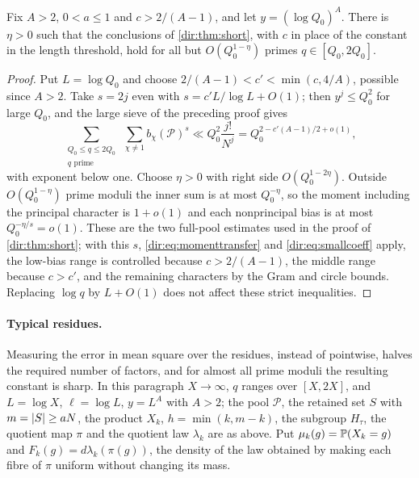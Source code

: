 \begin{corollary}\label{dir:cor:almostshort}
Fix $A>2$, $0<a\le1$ and $c>2/(A-1)$, and let $y=(\log Q_0)^A$. There is $\eta>0$ such that
the conclusions of \cref{dir:thm:short}, with $c$ in place of the constant in the length
threshold, hold for all but $O(Q_0^{1-\eta})$ primes $q\in[Q_0,2Q_0]$.
\end{corollary}

\begin{proof}
Put $L=\log Q_0$ and choose $2/(A-1)<c'<\min(c,4/A)$, possible since $A>2$. Take $s=2j$ even
with $s=c'L/\log L+O(1)$; then $y^j\le Q_0^2$ for large $Q_0$, and the large sieve of the
preceding proof gives
\[
 \sum_{\substack{Q_0\le q\le2Q_0\\ q\text{ prime}}}\ \sum_{\chi\ne1}b_\chi(\mathcal P)^s
 \ll Q_0^2\frac{j!}{N^j}=Q_0^{2-c'(A-1)/2+o(1)},
\]
with exponent below one. Choose $\eta>0$ with right side $O(Q_0^{1-2\eta})$. Outside
$O(Q_0^{1-\eta})$ prime moduli the inner sum is at most $Q_0^{-\eta}$, so the moment including
the principal character is $1+o(1)$ and each nonprincipal bias is at most
$Q_0^{-\eta/s}=o(1)$. These are the two full-pool estimates used in the proof of
\cref{dir:thm:short}; with this $s$, \eqref{dir:eq:momenttransfer} and \eqref{dir:eq:smallcoeff}
apply, the low-bias range is controlled because $c>2/(A-1)$, the middle range because $c>c'$,
and the remaining characters by the Gram and circle bounds. Replacing $\log q$ by $L+O(1)$
does not affect these strict inequalities.
\end{proof}

\paragraph{Typical residues.}
Measuring the error in mean square over the residues, instead of pointwise, halves the required
number of factors, and for almost all prime moduli the resulting constant is sharp. In this paragraph
$X\to\infty$, $q$ ranges over $[X,2X]$, and $L=\log X$, $\ell=\log L$, $y=L^A$ with $A>2$; the pool
$\mathcal P$, the retained set $S$ with $m=\lvert S\rvert\ge aN$, the product $X_k$, $h=\min(k,m-k)$, the
subgroup $H_\tau$, the quotient map $\pi$ and the quotient law $\lambda_k$ are as above. Put
$\mu_k(g)=\mathbb{P}(X_k=g)$ and $F_k(g)=d\lambda_k(\pi(g))$, the density of the law obtained by making each
fibre of $\pi$ uniform without changing its mass.

